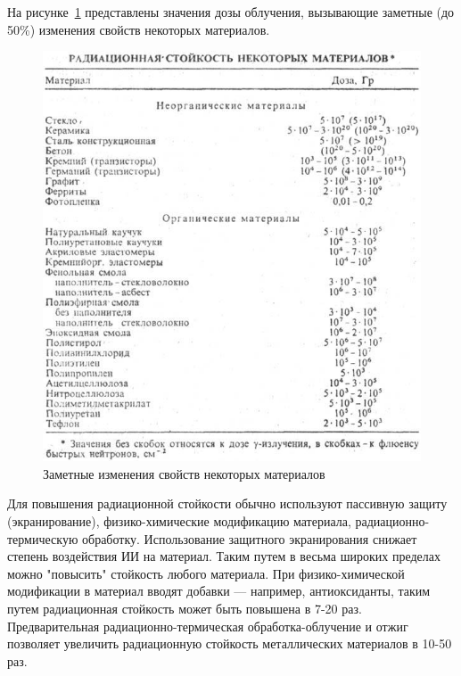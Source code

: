 На рисунке~\ref{fig:table} представлены значения дозы облучения, вызывающие заметные (до 50\%) изменения свойств некоторых материалов.

\begin{figure}[ht]
    \includegraphics[width=.8\linewidth]{Figures/table.jpg}
    \caption{Заметные изменения свойств некоторых материалов}
    \label{fig:table}
\end{figure}

Для повышения радиационной стойкости обычно используют пассивную защиту (экранирование), физико-химические модификацию материала, радиационно-термическую обработку. Использование защитного экранирования снижает степень воздействия ИИ на материал. Таким путем в весьма широких пределах можно "повысить" стойкость любого материала. При физико-химической модификации в материал вводят добавки --- например, антиоксиданты, таким путем радиационная стойкость может быть повышена в 7-20 раз. Предварительная радиационно-термическая обработка-облучение и отжиг позволяет увеличить радиационную стойкость металлических материалов в 10-50 раз.


